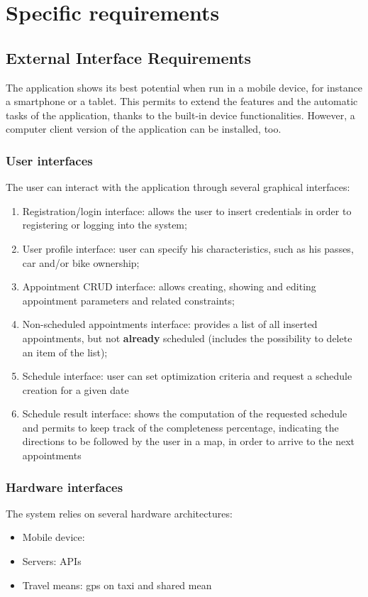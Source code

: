 \chapter{Specific requirements}

\section{External Interface Requirements}
The application shows its best potential when run in a mobile device, for instance a smartphone or a tablet. This permits to extend the features and the automatic tasks of the application, thanks to the built-in device functionalities. However, a computer client version of the application can be installed, too.

\subsection{User interfaces}
The user can interact with the application through several graphical interfaces:
\begin{enumerate}
\item Registration/login interface: allows the user to insert credentials in order to registering or logging into the system;
\item User profile interface: user can specify his characteristics, such as his passes, car and/or bike ownership;
\item Appointment CRUD interface: allows creating, showing and editing appointment parameters and related constraints;
\item Non-scheduled appointments interface: provides a list of all inserted appointments, but not \textbf{already} scheduled (includes the possibility to delete an item of the list);
\item Schedule interface: user can set optimization criteria and request a schedule creation for a given date
\item Schedule result interface: shows the computation of the requested schedule and permits to keep track of the completeness percentage, indicating the directions to be followed by the user in a map, in order to arrive to the next appointments
\end{enumerate}


\subsection{Hardware interfaces}
The system relies on several hardware architectures:
\begin{itemize}
\item Mobile device:
\item Servers: APIs
\item Travel means: gps on taxi and shared mean
\end{itemize}